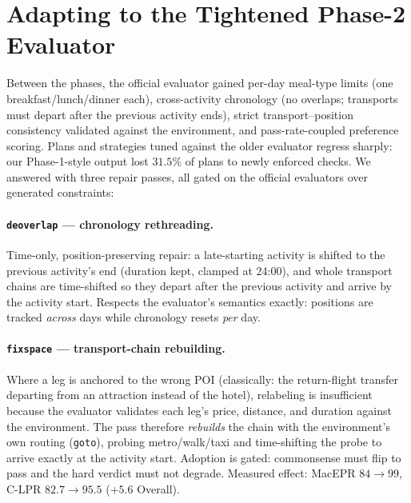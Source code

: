 \documentclass{article}
\begin{document}
\section{Adapting to the Tightened Phase-2 Evaluator}
\label{sec:adapt}

Between the phases, the official evaluator gained per-day meal-type limits
(one breakfast/lunch/dinner each), cross-activity chronology (no overlaps;
transports must depart after the previous activity ends), strict
transport--position consistency validated against the environment, and
pass-rate-coupled preference scoring. Plans and strategies tuned against
the older evaluator regress sharply: our Phase-1-style output lost $31.5\%$
of plans to newly enforced checks. We answered with three repair passes,
all gated on the official evaluators over generated constraints:

\paragraph{\texttt{deoverlap} --- chronology rethreading.}
Time-only, position-preserving repair: a late-starting activity is shifted
to the previous activity's end (duration kept, clamped at 24:00), and whole
transport chains are time-shifted so they depart after the previous
activity and arrive by the activity start. Respects the evaluator's
semantics exactly: positions are tracked \emph{across} days while
chronology resets \emph{per} day.

\paragraph{\texttt{fixspace} --- transport-chain rebuilding.}
Where a leg is anchored to the wrong POI (classically: the return-flight
transfer departing from an attraction instead of the hotel), relabeling is
insufficient because the evaluator validates each leg's price, distance,
and duration against the environment. The pass therefore \emph{rebuilds}
the chain with the environment's own routing (\texttt{goto}), probing
metro/walk/taxi and time-shifting the probe to arrive exactly at the
activity start. Adoption is gated: commonsense must flip to pass and the
hard verdict must not degrade. Measured effect: MacEPR $84\!\to\!99$,
C-LPR $82.7\!\to\!95.5$ ($+5.6$ Overall).
\end{document}

